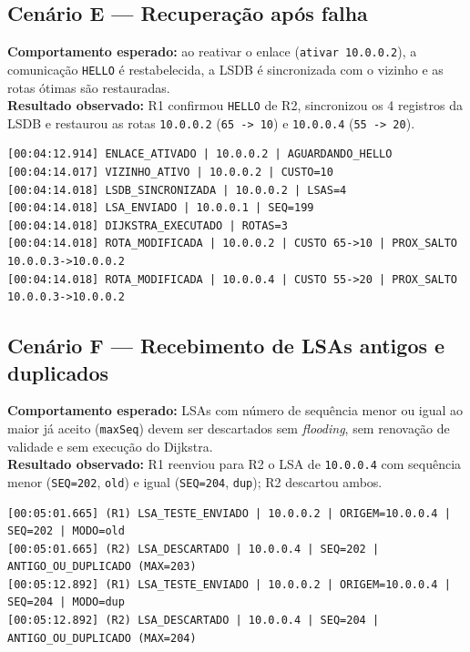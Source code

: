 ﻿\documentclass[11pt,a4paper]{article}
\begin{document}
\subsection{Cenário E --- Recuperação após falha}
\textbf{Comportamento esperado:} ao reativar o enlace (\texttt{ativar 10.0.0.2}), a comunicação \texttt{HELLO} é restabelecida, a LSDB é sincronizada com o vizinho e as rotas ótimas são restauradas.\\
\textbf{Resultado observado:} R1 confirmou \texttt{HELLO} de R2, sincronizou os 4 registros da LSDB e restaurou as rotas \texttt{10.0.0.2} (\texttt{65 -> 10}) e \texttt{10.0.0.4} (\texttt{55 -> 20}).
\begin{lstlisting}
[00:04:12.914] ENLACE_ATIVADO | 10.0.0.2 | AGUARDANDO_HELLO
[00:04:14.017] VIZINHO_ATIVO | 10.0.0.2 | CUSTO=10
[00:04:14.018] LSDB_SINCRONIZADA | 10.0.0.2 | LSAS=4
[00:04:14.018] LSA_ENVIADO | 10.0.0.1 | SEQ=199
[00:04:14.018] DIJKSTRA_EXECUTADO | ROTAS=3
[00:04:14.018] ROTA_MODIFICADA | 10.0.0.2 | CUSTO 65->10 | PROX_SALTO 10.0.0.3->10.0.0.2
[00:04:14.018] ROTA_MODIFICADA | 10.0.0.4 | CUSTO 55->20 | PROX_SALTO 10.0.0.3->10.0.0.2
\end{lstlisting}

\subsection{Cenário F --- Recebimento de LSAs antigos e duplicados}
\textbf{Comportamento esperado:} LSAs com número de sequência menor ou igual ao maior já aceito (\texttt{maxSeq}) devem ser descartados sem \emph{flooding}, sem renovação de validade e sem execução do Dijkstra.\\
\textbf{Resultado observado:} R1 reenviou para R2 o LSA de \texttt{10.0.0.4} com sequência menor (\texttt{SEQ=202}, \texttt{old}) e igual (\texttt{SEQ=204}, \texttt{dup}); R2 descartou ambos.
\begin{lstlisting}
[00:05:01.665] (R1) LSA_TESTE_ENVIADO | 10.0.0.2 | ORIGEM=10.0.0.4 | SEQ=202 | MODO=old
[00:05:01.665] (R2) LSA_DESCARTADO | 10.0.0.4 | SEQ=202 | ANTIGO_OU_DUPLICADO (MAX=203)
[00:05:12.892] (R1) LSA_TESTE_ENVIADO | 10.0.0.2 | ORIGEM=10.0.0.4 | SEQ=204 | MODO=dup
[00:05:12.892] (R2) LSA_DESCARTADO | 10.0.0.4 | SEQ=204 | ANTIGO_OU_DUPLICADO (MAX=204)
\end{lstlisting}
\end{document}
